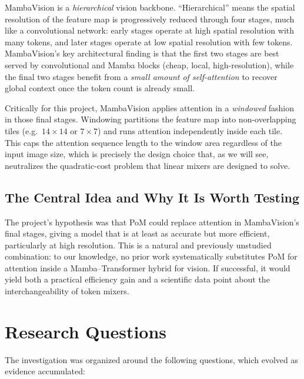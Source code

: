 \documentclass[11pt,a4paper]{article}
\begin{document}
MambaVision is a \emph{hierarchical} vision backbone. ``Hierarchical'' means the spatial resolution of the feature map is progressively reduced through four stages, much like a convolutional network: early stages operate at high spatial resolution with many tokens, and later stages operate at low spatial resolution with few tokens. MambaVision's key architectural finding is that the first two stages are best served by convolutional and Mamba blocks (cheap, local, high-resolution), while the final two stages benefit from a \emph{small amount of self-attention} to recover global context once the token count is already small.

Critically for this project, MambaVision applies attention in a \emph{windowed} fashion in those final stages. Windowing partitions the feature map into non-overlapping tiles (e.g.\ $14\times14$ or $7\times7$) and runs attention independently inside each tile. This caps the attention sequence length to the window area regardless of the input image size, which is precisely the design choice that, as we will see, neutralizes the quadratic-cost problem that linear mixers are designed to solve.

\subsection{The Central Idea and Why It Is Worth Testing}

The project's hypothesis was that PoM could replace attention in MambaVision's final stages, giving a model that is at least as accurate but more efficient, particularly at high resolution. This is a natural and previously unstudied combination: to our knowledge, no prior work systematically substitutes PoM for attention inside a Mamba--Transformer hybrid for vision. If successful, it would yield both a practical efficiency gain and a scientific data point about the interchangeability of token mixers.

\section{Research Questions}

The investigation was organized around the following questions, which evolved as evidence accumulated:
\end{document}
